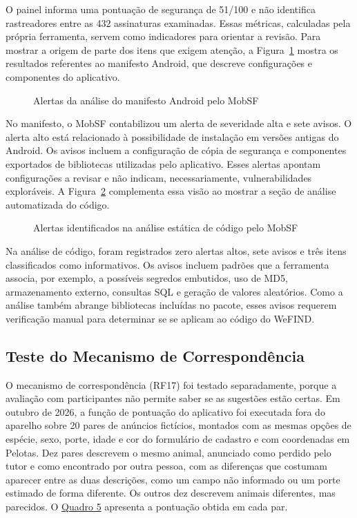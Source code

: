 O painel informa uma pontuação de segurança de 51/100 e não identifica rastreadores entre as 432 assinaturas examinadas. Essas métricas, calculadas pela própria ferramenta, servem como indicadores para orientar a revisão. Para mostrar a origem de parte dos itens que exigem atenção, a Figura~\ref{fig:mobsf_manifesto} mostra os resultados referentes ao manifesto Android, que descreve configurações e componentes do aplicativo.

\begin{figure}[H]
    \centering
    \caption{Alertas da análise do manifesto Android pelo MobSF}
    \label{fig:mobsf_manifesto}
\end{figure}

No manifesto, o MobSF contabilizou um alerta de severidade alta e sete avisos. O alerta alto está relacionado à possibilidade de instalação em versões antigas do Android. Os avisos incluem a configuração de cópia de segurança e componentes exportados de bibliotecas utilizadas pelo aplicativo. Esses alertas apontam configurações a revisar e não indicam, necessariamente, vulnerabilidades exploráveis. A Figura~\ref{fig:mobsf_codigo} complementa essa visão ao mostrar a seção de análise automatizada do código.

\begin{figure}[H]
    \centering
    \caption{Alertas identificados na análise estática de código pelo MobSF}
    \label{fig:mobsf_codigo}
\end{figure}

Na análise de código, foram registrados zero alertas altos, sete avisos e três itens classificados como informativos. Os avisos incluem padrões que a ferramenta associa, por exemplo, a possíveis segredos embutidos, uso de MD5, armazenamento externo, consultas SQL e geração de valores aleatórios. Como a análise também abrange bibliotecas incluídas no pacote, esses avisos requerem verificação manual para determinar se se aplicam ao código do WeFIND.

\subsection{Teste do Mecanismo de Correspondência}

O mecanismo de correspondência (RF17) foi testado separadamente, porque a avaliação com participantes não permite saber se as sugestões estão certas. Em outubro de 2026, a função de pontuação do aplicativo foi executada fora do aparelho sobre 20 pares de anúncios fictícios, montados com as mesmas opções de espécie, sexo, porte, idade e cor do formulário de cadastro e com coordenadas em Pelotas. Dez pares descrevem o mesmo animal, anunciado como perdido pelo tutor e como encontrado por outra pessoa, com as diferenças que costumam aparecer entre as duas descrições, como um campo não informado ou um porte estimado de forma diferente. Os outros dez descrevem animais diferentes, mas parecidos. O \hyperref[quadro:teste_correspondencia]{Quadro 5} apresenta a pontuação obtida em cada par.

